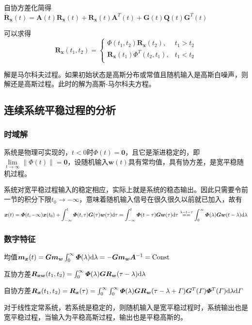 \documentclass[11pt,a4paper]{ctexart}
\renewcommand{\d}{{\rm d}}
\begin{document}
            自协方差化简得$\bm{\dot R_x}(t)=\bm{A}(t)\bm{R_x}(t)+\bm{R_x}(t)\bm{A}^T(t)+\bm{G}(t)\bm{Q}(t)\bm G^T(t)$

            可以求得
            \[
            \bm{R_x}(t_1,t_2)=
            \begin{cases}
            \bm\varPhi(t_1,t_2)\bm{R_x}(t_2),&t_1>t_2\\
            \bm{R_x}(t_1)\bm\varPhi^T(t_2,t_1),&t_1<t_2\\
            \end{cases}
            \]

            解是马尔科夫过程。如果初始状态是高斯分布或常值且随机输入是高斯白噪声，则解还是高斯过程。此时的解为高斯-马尔科夫方程。
    \subsection{连续系统平稳过程的分析}
        \subsubsection{时域解}
            系统是物理可实现的，$t<0$时$\bm \varPhi(t)=\bm 0$，且它是渐进稳定的，即$\lim\limits_{t\rightarrow\infty}\|\bm \varPhi(t)\|=\bm 0$，设随机输入$\bm w(t)$具有常均值，具有协方差，是宽平稳随机过程。

            系统对宽平稳过程输入的稳定相应，实际上就是系统的稳态输出。因此只需要令前一节的积分下限$t_0\rightarrow-\infty$，意味着随机输入信号在很久很久以前就已加入，故有
            \[
            \bm x(t)=\bm\varPhi(t,-\infty)\bm x(t_0)+\int_{-\infty}^t\bm\varPhi(t,\tau)\bm G(\tau)\bm w(\tau)\d\tau=\int_{-\infty}^t\bm\varPhi(t-\tau)\bm G\bm w(\tau)\d\tau\overset{\lambda=t-\tau}{==}\int_0^\infty\bm\varPhi(\lambda)\bm G\bm w(t-\lambda)\d\lambda
            \]
        \subsubsection{数字特征}
            均值$\bm{m_x}(t)=\bm{Gm_w}\int_0^\infty\bm\varPhi(\lambda)\d\lambda=-\bm{Gm_wA}^{-1}={\rm Const}$

            互协方差$\bm{R_{xw}}(t_1,t_2)=\int_0^\infty\bm\varPhi(\lambda)\bm{GR_w}(\tau-\lambda)\d\lambda$

            自协方差$\bm{R_x}(t_1,t_2)=\bm{R_x}(\tau)=\int_0^\infty\int_0^\infty\bm\varPhi(\lambda)\bm{GR_w}(\tau-\lambda+\varGamma)\bm G^T(\varGamma)\bm\varPhi^T(\varGamma)\d\lambda\d\varGamma$

            对于线性定常系统，若系统是稳定的，则随机输入是宽平稳过程时，系统输出也是宽平稳过程，当输入为平稳高斯过程，输出也是平稳高斯的。
\end{document}
